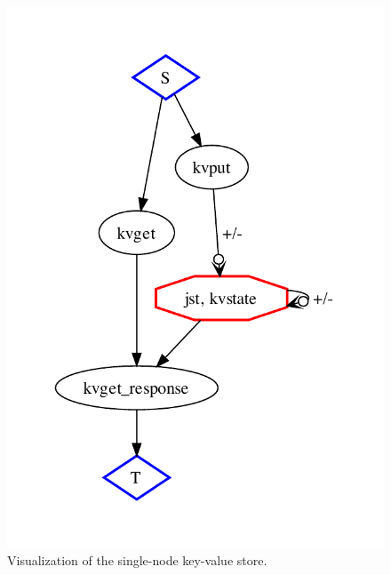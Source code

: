 \begin{figure}[t]
\centering
\includegraphics[width=0.5\linewidth]{fig/basickvs.pdf}
\vspace{-10pt}
\caption{Visualization of the single-node key-value store.}
\label{fig:pdg-kvs-analysis}
\vspace{-2pt}
\end{figure}
